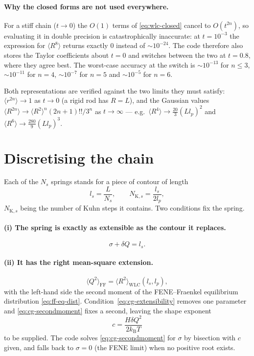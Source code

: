 \documentclass[11pt,a4paper]{report}
\newcommand{\kB}{k_\mathrm{B}}
\begin{document}
\paragraph{Why the closed forms are not used everywhere.} For a stiff chain
($t\to0$) the $O(1)$ terms of \eqref{eq:wlc-closed} cancel to $O(t^{2n})$, so
evaluating it in double precision is catastrophically inaccurate: at $t = 10^{-3}$
the expression for $\langle R^{8}\rangle$ returns exactly $0$ instead of $\sim
10^{-24}$. The code therefore also stores the Taylor coefficients about $t=0$ and
switches between the two at $t = 0.8$, where they agree best. The worst-case
accuracy at the switch is $\sim10^{-13}$ for $n \le 3$, $\sim10^{-11}$ for $n=4$,
$\sim10^{-7}$ for $n=5$ and $\sim10^{-5}$ for $n=6$.

Both representations are verified against the two limits they must satisfy:
$\langle r^{2n}\rangle \to 1$ as $t\to0$ (a rigid rod has $R = L$), and the
Gaussian values $\langle R^{2n}\rangle \to \langle R^{2}\rangle^{n}(2n+1)!!/3^{n}$
as $t\to\infty$ --- e.g.\ $\langle R^{4}\rangle \to \tfrac{20}{3}(L l_p)^{2}$ and
$\langle R^{6}\rangle \to \tfrac{280}{9}(L l_p)^{3}$.

\section{Discretising the chain}

Each of the $N_s$ springs stands for a piece of contour of length
\begin{equation}
  l_s = \frac{L}{N_s},
  \qquad
  N_{\mathrm{K},s} = \frac{l_s}{2 l_p},
\end{equation}
$N_{\mathrm{K},s}$ being the number of Kuhn steps it contains. Two conditions fix
the spring.

\paragraph{(i) The spring is exactly as extensible as the contour it replaces.}
\begin{equation}
  \sigma + \delta Q = l_s .
  \label{eq:cg-extensibility}
\end{equation}

\paragraph{(ii) It has the right mean-square extension.}
\begin{equation}
  \langle Q^{2}\rangle_{\mathrm{FF}} = \langle R^{2}\rangle_{\mathrm{WLC}}(l_s, l_p),
  \label{eq:cg-secondmoment}
\end{equation}
with the left-hand side the second moment of the FENE--Fraenkel equilibrium
distribution \eqref{eq:ff-eq-dist}. Condition~\eqref{eq:cg-extensibility} removes
one parameter and \eqref{eq:cg-secondmoment} fixes a second, leaving the shape
exponent
\begin{equation}
  c = \frac{H \delta Q^{2}}{2 \kB T}
\end{equation}
to be supplied. The code solves \eqref{eq:cg-secondmoment} for $\sigma$ by
bisection with $c$ given, and falls back to $\sigma = 0$ (the FENE limit) when no
positive root exists.
\end{document}
